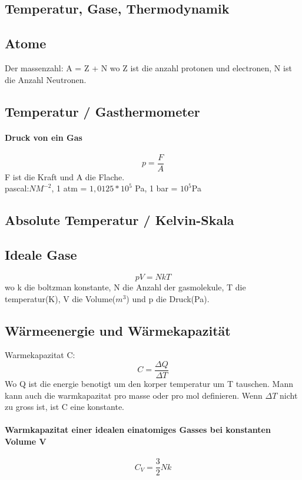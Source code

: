 \documentclass[7pt]{article}
\begin{document}
\begin{multicols*}{3}

\section{Temperatur, Gase,    Thermodynamik}
\subsection{Atome}
Der massenzahl: A = Z + N wo Z ist die anzahl protonen und electronen, N ist die Anzahl Neutronen.
\subsection{Temperatur / Gasthermometer}
\paragraph{Druck von ein Gas}
\begin{equation}
	p=\frac{F}{A}
\end{equation}
F ist die Kraft und A die Flache.\\
pascal:$NM^{-2}$, 1 atm = $1,0125 * 10^5$ Pa, 1 bar = $10^5$Pa
\subsection{Absolute Temperatur / Kelvin-Skala}

\subsection{Ideale Gase}
\begin{equation}
	pV=NkT
\end{equation}
wo k die boltzman konstante, N die Anzahl der gasmolekule, T die temperatur(K), V die Volume($m^3$) und p die Druck(Pa).
\subsection{W{\"a}rmeenergie und W{\"a}rmekapazit{\"a}t}
Warmekapazitat C:
\begin{equation}
	C=\frac{\Delta Q}{\Delta T}
\end{equation}
Wo Q ist die energie benotigt um den korper temperatur um T tauschen. Mann kann auch die warmkapazitat pro masse oder pro mol definieren. Wenn $\Delta T$ nicht zu gross ist, ist C eine konstante.
\paragraph{Warmkapazitat einer idealen einatomiges Gasses bei konstanten Volume V}
\begin{equation}
	C_V=\frac{3}{2}Nk
\end{equation}

\end{multicols*}
\end{document}
